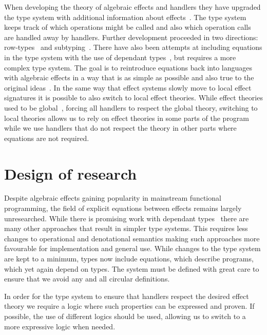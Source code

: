 \documentclass{article}
\begin{document}
When developing the theory of algebraic effects and handlers they have upgraded the type system with additional information about effects~\cite{DBLP:conf/esop/PlotkinP09}. The type system keeps track of which operations might be called and also which operation calls are handled away by handlers. Further development proceeded in two directions: row-types~\cite{DBLP:conf/icfp/HillerstromL16} and subtyping~\cite{DBLP:conf/esop/SalehKPS18}. There have also been attempts at including equations in the type system with the use of dependant types~\cite{DBLP:journals/pacmpl/Ahman18}, but requires a more complex type system. The goal is to reintroduce equations back into languages with algebraic effects in a way that is as simple as possible and also true to the original ideas~\cite{DBLP:phd/ethos/Pretnar10}. In the same way that effect systems slowly move to local effect signatures it is possible to also switch to local effect theories. While effect theories used to be global~\cite{DBLP:conf/esop/PlotkinP09}, forcing all handlers to respect the global theory, switching to local theories allows us to rely on effect theories in some parts of the program while we use handlers that do not respect the theory in other parts where equations are not required.


\section*{Design of research}

Despite algebraic effects gaining popularity in mainstream functional programming, the field of explicit equations between effects remains largely unresearched. While there is promising work with dependant types~\cite{DBLP:journals/pacmpl/Ahman18} there are many other approaches that result in simpler type systems. This requires less changes to operational and denotational semantics making such approaches more favourable for implementation and general use. While changes to the type system are kept to a minimum, types now include equations, which describe programs, which yet again depend on types. The system must be defined with great care to ensure that we avoid any and all circular definitions. 

In order for the type system to ensure that handlers respect the desired effect theory we require a logic where such properties can be expressed and proven. If possible, the use of different logics should be used, allowing us to switch to a more expressive logic when needed. 
\end{document}
